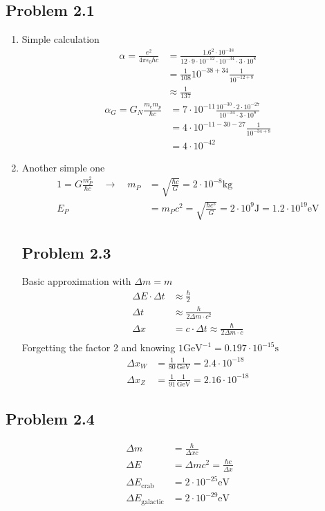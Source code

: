 \documentclass[../main.tex]{subfiles}
\begin{document}
\subsection{Problem 2.1}
\begin{enumerate}
\item Simple calculation
\begin{align}
\alpha=\frac{e^2}{4\pi\epsilon_0\hbar c}&=\frac{1.6^2\cdot 10^{-38}}{12\cdot 9\cdot 10^{-12}\cdot 10^{-34}\cdot3\cdot10^8}\\
&=\frac{1}{108}10^{-38+34}\frac{1}{10^{-12+8}}\\
&\approx\frac{1}{137}
\end{align}
\begin{align}
\alpha_G=G_N\frac{m_em_p}{\hbar c}&=7\cdot10^{-11}\frac{10^{-30}\cdot2\cdot10^{-27}}{10^{-34}\cdot3\cdot10^8}\\
&=4\cdot10^{-11-30-27}\frac{1}{10^{-34+8}}\\
&=4\cdot10^{-42}
\end{align}
\item Another simple one
\begin{align}
1=G\frac{m_P^2}{\hbar c}\quad\rightarrow\quad m_P&=\sqrt{\frac{\hbar c}{G}}=2\cdot10^{-8}\text{kg}\\
E_P&=m_Pc^2=\sqrt{\frac{\hbar c^5}{G}}=2\cdot10^9\text{J}=1.2\cdot10^{19}\text{eV}
\end{align}

\subsection{Problem 2.3}
Basic approximation with $\Delta m = m$
\begin{align}
\Delta E\cdot\Delta t&\approx\frac{\hbar}{2}\\
\Delta t&\approx\frac{\hbar}{2\Delta m\cdot c^2}\\
\Delta x&=c\cdot\Delta t\approx\frac{\hbar}{2\Delta m\cdot c}\\
\end{align}
Forgetting the factor 2 and knowing $1\text{GeV}^{-1}= 0.197\cdot10^{-15}\text{s}$
\begin{align}
\Delta x_W&=\frac{1}{80}\frac{1}{\text{GeV}}=2.4\cdot10^{-18}\\
\Delta x_Z&=\frac{1}{91}\frac{1}{\text{GeV}}=2.16\cdot10^{-18}
\end{align}
\end{enumerate}

\subsection{Problem 2.4}
\begin{align}
\Delta m &= \frac{\hbar}{\Delta x c}\\
\Delta E &= \Delta m c^2=\frac{\hbar c}{\Delta x}\\
\Delta E_\text{crab}&=2\cdot10^{-25}\text{eV}\\
\Delta E_\text{galactic}&=2\cdot10^{-29}\text{eV}
\end{align}
\end{document}
